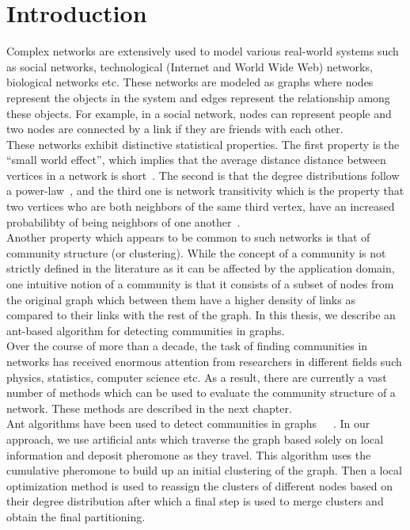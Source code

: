 \chapter{Introduction}
\begin{spacing}{1.5}
\thispagestyle{empty}
Complex networks are extensively used to model various real-world systems such as social networks, technological (Internet and World Wide Web) networks, biological networks etc. These networks are modeled as graphs where nodes represent the objects in the system and edges represent the relationship among these objects. For example, in a social network, nodes can represent people and two nodes are connected by a link if they are friends with each other. \\
\indent These networks exhibit distinctive statistical properties. The first property is the ``small world effect'', which implies that the average distance distance between vertices in a network is short~\cite{milgram67smallworld}. The second is that the degree distributions follow a power-law~\cite{Barabasi99emergenceScaling}, and the third one is network transitivity which is the property that two vertices who are both neighbors of the same third vertex, have an increased probabilibty of being neighbors of one another~\cite{Watts-Colective-1998}.\\
\indent Another property which appears to be common to such networks is that of community structure (or clustering). While the concept of a community is not strictly defined in the literature as it can be affected by the application domain, one intuitive notion of a community is that it consists of a subset of nodes from the original graph which between them have a higher density of links as compared to their links with the rest of the graph. In this thesis, we describe an ant-based algorithm for detecting communities in graphs.\\
\indent Over the course of more than a decade, the task of finding communities in networks has received enormous attention from researchers in different fields such physics, statistics, computer science etc. As a result, there are currently a vast number of methods which can be used to evaluate the community structure of a network. These methods are described in the next chapter.\\
\indent Ant algorithms have been used to detect communities in graphs~\cite{DBLP:journals/corr/abs-1303-4711}~\cite{5586496}~\cite{Jin:2011:ACO:2022850.2022861}. In our approach, we use artificial ants which traverse the graph based solely on local information and deposit pheromone as they travel. This algorithm uses the cumulative pheromone to build up an initial clustering of the graph. Then a local optimization method is used to reassign the clusters of different nodes based on their degree distribution after which a final step is used to merge clusters and obtain the final partitioning.\\

\end{spacing}
